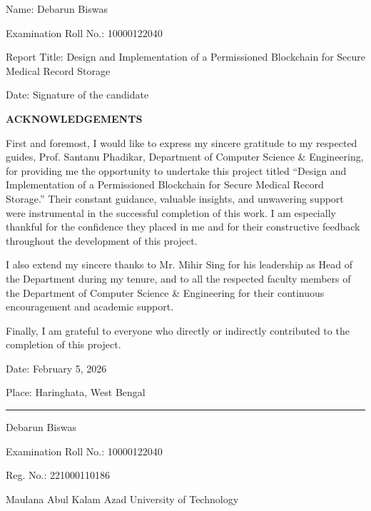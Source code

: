 \vspace{1.5cm}

Name: Debarun Biswas

Examination Roll No.: 10000122040

Report Title: Design and Implementation of a Permissioned Blockchain for Secure Medical Record Storage

\vspace{2.5cm}

Date: \hspace{10cm} Signature of the candidate

\newpage
\setcounter{page}{5}

\begin{center}
\textbf{ACKNOWLEDGEMENTS}
\end{center}

\vspace{0.6cm}

First and foremost, I would like to express my sincere gratitude to my respected guides, Prof. Santanu Phadikar, Department of Computer Science \& Engineering, for providing me the opportunity to undertake this project titled “Design and Implementation of a Permissioned Blockchain for Secure Medical Record Storage.” Their constant guidance, valuable insights, and unwavering support were instrumental in the successful completion of this work. I am especially thankful for the confidence they placed in me and for their constructive feedback throughout the development of this project.

I also extend my sincere thanks to Mr. Mihir Sing for his leadership as Head of the Department during my tenure, and to all the respected faculty members of the Department of Computer Science \& Engineering for their continuous encouragement and academic support.

Finally, I am grateful to everyone who directly or indirectly contributed to the completion of this project.

\vspace{1.5cm}

Date: February 5, 2026

Place: Haringhata, West Bengal

\vspace{1cm}
\begin{flushright}
\rule{6cm}{0.4pt}

Debarun Biswas

Examination Roll No.: 10000122040

Reg. No.: 221000110186

Maulana Abul Kalam Azad University of Technology
\end{flushright}
\newpage

